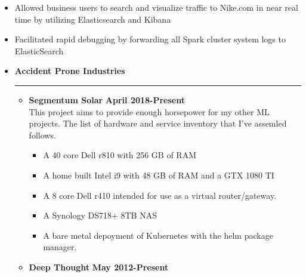 \documentclass[overlapped]{res}
\begin{document}
\begin{resume}
\begin{itemize}[leftmargin=0in]
\begin{itemize}[leftmargin=0in]
\begin{samepage}
\begin{itemize}
                        \item[\textbullet] Allowed business users to search and visualize traffic to Nike.com in near real time by utilizing Elasticsearch and Kibana 
                        \item[\textbullet] Facilitated rapid debugging by forwarding all Spark cluster system logs to ElasticSearch
                    \end{itemize}
                \end{samepage}
        \end{itemize}
\end{itemize}
\vspace{0.25in}

\begin{itemize}[leftmargin=0in]
    \item[] \textbf{Accident Prone Industries} \\[-0.1in] \rule{\textwidth}{0.5pt}
        \begin{itemize}[leftmargin=0in]
            \item[] 
                \begin{samepage}
                    \textbf{Segmentum Solar} \hfill \textbf{April 2018-Present} \\
                    This project aims to provide enough horsepower for my other ML projects. The list of hardware and service inventory that I've assemled follows.
                    \begin{itemize}
                        \item[\textbullet] A 40 core Dell r810 with 256 GB of RAM
                        \item[\textbullet] A home built Intel i9 with 48 GB of RAM and a GTX 1080 TI
                        \item[\textbullet] A 8 core Dell r410 intended for use as a virtual router/gateway.
                        \item[\textbullet] A Synology DS718+ 8TB NAS
                        \item[\textbullet] A bare metal depoyment of Kubernetes with the helm package manager.
                    \end{itemize}
                \end{samepage}
            \item[] 
                \begin{samepage}
                    \textbf{Deep Thought} \hfill \textbf{May 2012-Present} \\

\end{samepage}
\end{itemize}
\end{itemize}
\end{resume}
\end{document}
